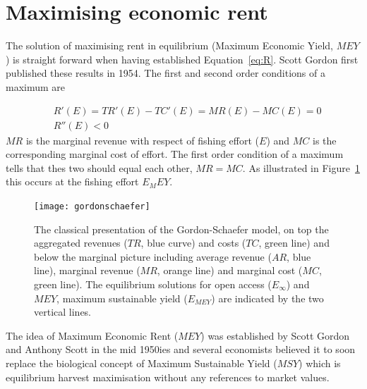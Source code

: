 \documentclass[11pt,fleqn]{book} %
\begin{document}
\begin{figure}[!htb]
\end{figure}

\section{Maximising economic rent}\label{MEY}

The solution of maximising rent in equilibrium (Maximum Economic Yield, $MEY$) is straight forward when having established Equation~\ref{eq:R}. Scott Gordon\cite{Gordon1954} first published these results in 1954. The first and second order conditions of a maximum are

\begin{equation}
\label{eq:mey}
\begin{aligned} & R'(E) = TR'(E) - TC'(E) = MR(E) - MC(E) = 0\\
& R''(E) < 0
\end{aligned}
\end{equation}
$MR$ is the marginal revenue with respect of fishing effort ($E$) and $MC$ is the corresponding marginal cost of effort. The first order condition of a maximum tells that thes two should equal each other, $MR = MC$. As illustrated in Figure~\ref{fig:gordonschaefer} this occurs at the fishing effort $E_MEY$.
 
\begin{figure}[ht]
\centering
\texttt{[image: gordonschaefer]}
\caption{The classical presentation of the Gordon-Schaefer model, on top the aggregated revenues ($TR$, blue curve) and costs ($TC$, green line) and below the marginal picture including average revenue ($AR$, blue line), marginal revenue ($MR$, orange line) and marginal cost ($MC$, green line). The equilibrium solutions for open access ($E_\infty$) and $MEY$, maximum sustainable yield ($E_{MEY}$) are indicated by the two vertical lines.}
\label{fig:gordonschaefer}
\end{figure}
\hfill \break
The idea of Maximum Economic Rent ($MEY$) was established by Scott Gordon and Anthony Scott in the mid 1950ies and several economists believed it to soon replace the biological concept of Maximum Sustainable Yield ($MSY$) which is equilibrium harvest maximisation without any references to market values.
\end{document}
